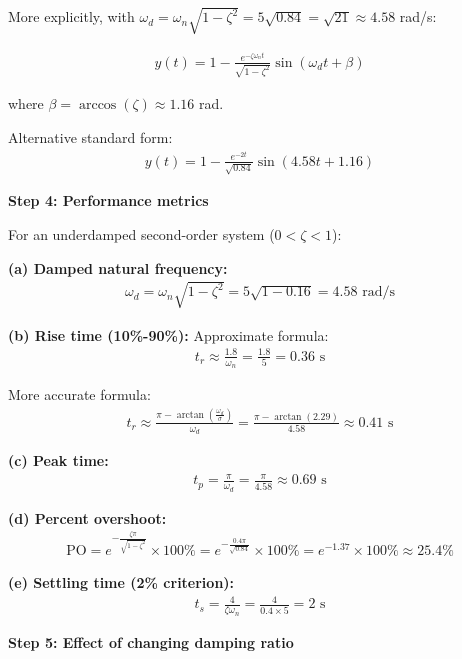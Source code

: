 \documentclass[11pt,a4paper]{article}
\begin{document}
More explicitly, with $\omega_d = \omega_n\sqrt{1-\zeta^2} = 5\sqrt{0.84} = \sqrt{21} \approx 4.58$ rad/s:

\begin{align}
  y(t) = 1 - \frac{e^{-\zeta\omega_n t}}{\sqrt{1-\zeta^2}}\sin(\omega_d t + \beta)
\end{align}

where $\beta = \arccos(\zeta) \approx 1.16$ rad.

Alternative standard form:
\begin{align}
  y(t) = 1 - \frac{e^{-2t}}{\sqrt{0.84}}\sin(4.58t + 1.16)
\end{align}

\textbf{Step 4: Performance metrics}

For an underdamped second-order system ($0 < \zeta < 1$):

\textbf{(a) Damped natural frequency:}
\begin{align}
  \omega_d = \omega_n\sqrt{1-\zeta^2} = 5\sqrt{1-0.16} = 4.58 \text{ rad/s}
\end{align}

\textbf{(b) Rise time (10\%-90\%):} Approximate formula:
\begin{align}
  t_r \approx \frac{1.8}{\omega_n} = \frac{1.8}{5} = 0.36 \text{ s}
\end{align}

More accurate formula:
\begin{align}
  t_r \approx \frac{\pi - \arctan\left(\frac{\omega_d}{\sigma}\right)}{\omega_d} = \frac{\pi - \arctan(2.29)}{4.58} \approx 0.41 \text{ s}
\end{align}

\textbf{(c) Peak time:}
\begin{align}
  t_p = \frac{\pi}{\omega_d} = \frac{\pi}{4.58} \approx 0.69 \text{ s}
\end{align}

\textbf{(d) Percent overshoot:}
\begin{align}
  \text{PO} = e^{-\frac{\zeta\pi}{\sqrt{1-\zeta^2}}} \times 100\% = e^{-\frac{0.4\pi}{\sqrt{0.84}}} \times 100\% = e^{-1.37} \times 100\% \approx 25.4\%
\end{align}

\textbf{(e) Settling time (2\% criterion):}
\begin{align}
  t_s = \frac{4}{\zeta\omega_n} = \frac{4}{0.4 \times 5} = 2 \text{ s}
\end{align}

\textbf{Step 5: Effect of changing damping ratio}
\end{document}
